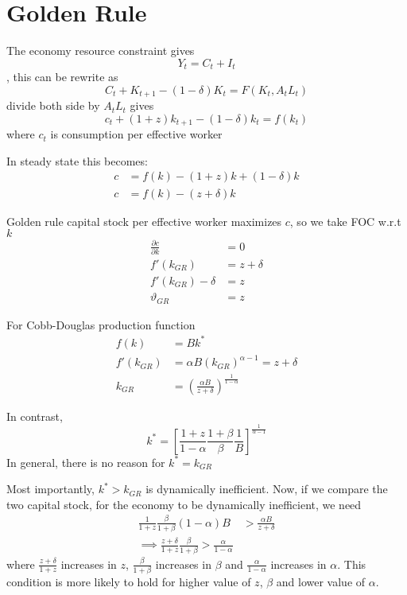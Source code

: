 \documentclass[twocolumn, fleqn]{article}
\begin{document}
	\section{Golden Rule}\label{sec:golden-rule}
		The economy resource constraint gives \[Y_t = C_t + I_t\], this can be rewrite as
		\[C_t + K_{t+1} - (1-\delta)K_t = F(K_t, A_t L_t)\]
		divide both side by $A_t L_t$ gives
		\[c_t + (1+z)k_{t+1}-(1-\delta)k_t = f(k_t)\]
		where $c_t$ is consumption per effective worker

		In steady state this becomes:
		\begin{align*}
			c &= f(k) -(1+z)k+(1-\delta)k\\
			c &= f(k) - (z+\delta)k
		\end{align*}

		Golden rule capital stock per effective worker maximizes $c$, so we take FOC w.r.t $k$
		\begin{align*}
			\frac{\partial c}{\partial k} &= 0\\
			f'(k_{GR}) &= z+\delta\\
			f'(k_{GR})-\delta &= z\\
			\vartheta_{GR} &= z
		\end{align*}

		For Cobb-Douglas production function
		\begin{align*}
			f(k) &= Bk^{\ast}\\
			f'(k_{GR}) &= \alpha B(k_{GR})^{\alpha-1}=z+\delta\\
			k_{GR} &= \left( \frac{\alpha B}{z+\delta} \right)^{\frac{1}{1-\alpha}}
		\end{align*}

		In contrast, \[k^\ast = \left[ \frac{1+z}{1-\alpha} \frac{1+\beta}{\beta} \frac{1}{B} \right]^{\frac{1}{\alpha -1}}\]
		In general, there is no reason for $k^\ast =k_{GR}$

		Most importantly, $k^\ast > k_{GR}$ is dynamically inefficient.
		Now, if we compare the two capital stock, for the economy to be dynamically inefficient, we need
		\begin{align*}
			\frac{1}{1+z} \frac{\beta}{1+\beta}(1-\alpha)B &> \frac{\alpha B}{z+\delta}\\
			\implies \frac{z+\delta}{1+z} \frac{\beta}{1+\beta} > \frac{\alpha}{1-\alpha}
		\end{align*}
		where $\frac{z+\delta}{1+z}$ increases in $z$, $\frac{\beta}{1+\beta}$ increases in $\beta$ and
		$\frac{\alpha}{1-\alpha}$ increases in $\alpha$.
		This condition is more likely to hold for higher value of $z$, $\beta$ and lower value of
		$\alpha$.
\end{document}
